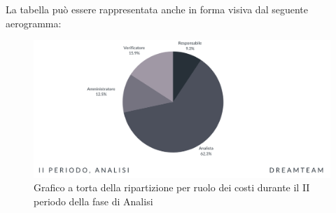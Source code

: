 La tabella può essere rappresentata anche in forma visiva dal seguente aerogramma:

\begin{figure}[!h]
\centering
\includegraphics[scale=0.65]{Sezioni/SezioniPreventivo/grafici/Analisi_II_periodo_costi.png}
\caption{Grafico a torta della ripartizione per ruolo dei costi durante il II periodo della fase di Analisi}
\end{figure}



